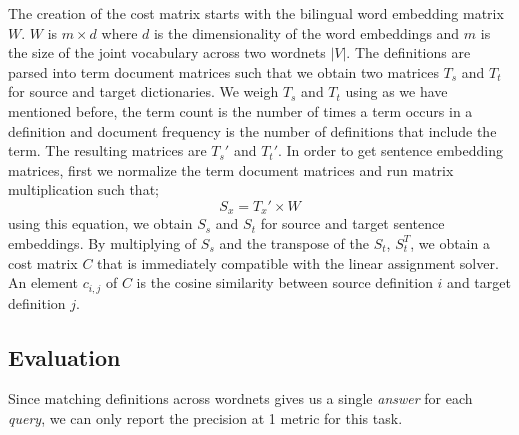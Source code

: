 The creation of the cost matrix starts with the bilingual word embedding matrix $W$.
$W$ is $m \times d$ where $d$ is the dimensionality of the word embeddings and $m$ is the size of the joint vocabulary across two wordnets $|V|$.
The definitions are parsed into term document matrices such that we obtain two matrices $T_{s}$ and $T_{t}$ for source and target dictionaries.
We weigh $T_s$ and $T_t$ using \tfidf{} as we have mentioned before, the term count is the number of times a term occurs in a definition and document frequency is the number of definitions that include the term.
The resulting matrices are $T_s'$ and $T_t'$.
In order to get sentence embedding matrices, first we normalize the term document matrices and run matrix multiplication such that;
\begin{equation}
    S_{x} = T_x' \times W
\end{equation}
using this equation, we obtain $S_s$ and $S_t$ for source and target sentence embeddings.
By multiplying of $S_s$ and the transpose of the $S_t$, $S_t^T$, we obtain a cost matrix $C$ that is immediately compatible with the linear assignment solver.
An element $c_{i,j}$ of $C$ is the cosine similarity between source definition $i$ and target definition $j$.

\subsection{Evaluation}%
\label{sub:evaluation}

Since matching definitions across wordnets gives us a single \emph{answer} for each \emph{query}, we can only report the precision at 1 metric for this task.
